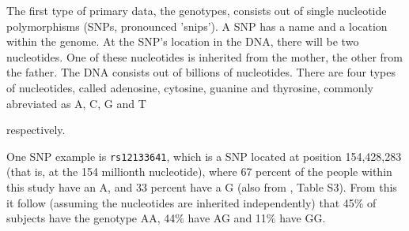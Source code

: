 The first type of primary data, the genotypes, 
consists out of single nucleotide polymorphisms (SNPs, pronounced 'snips').
A SNP has a name and a location within the genome.
At the SNP's location in the DNA, there will be two nucleotides.
One of these nucleotides is inherited from the mother, 
the other from the father.
The DNA consists out of billions of nucleotides.
There are four types of nucleotides,
called adenosine, cytosine, guanine and thyrosine, 
commonly abreviated as A, C, G and T 

respectively.


One SNP example is \verb|rs12133641|, which is a SNP located at position 
154,428,283 (that is, at the 154 millionth nucleotide), 
where 67 percent of the people within this study have an A,
and 33 percent have a G (also from \cite{ahsan2017relative}, Table S3).
From this it follow (assuming the nucleotides are inherited independently)
that 45\% of subjects have the genotype AA, 44\% have AG and 11\% have GG.

